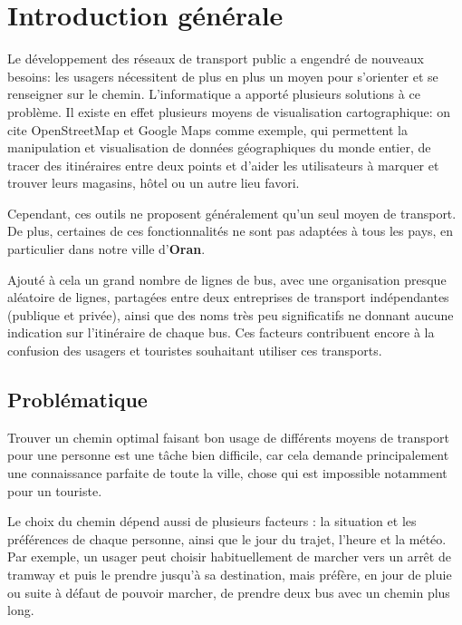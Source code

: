 \renewcommand\labelitemi{$\bullet$}
\renewcommand\labelitemii{$\circ$}
\chapter{Introduction générale}

Le développement des réseaux de transport public a engendré de nouveaux besoins: les usagers nécessitent de plus en plus un moyen pour s'orienter et se renseigner sur le chemin.\newline
L'informatique a apporté plusieurs solutions à ce problème. Il existe en effet plusieurs moyens de visualisation cartographique: on cite OpenStreetMap et Google Maps comme exemple, qui permettent la manipulation et visualisation de données géographiques du monde entier, de tracer des itinéraires entre deux points et d'aider les utilisateurs à marquer et trouver leurs magasins, hôtel ou un autre lieu favori.


Cependant, ces outils ne proposent généralement qu'un seul moyen de transport. De plus, certaines de ces fonctionnalités ne sont pas adaptées à tous les pays, en particulier dans notre ville d'\textbf{Oran}. 

Ajouté à cela un grand nombre de lignes de bus, avec une organisation presque aléatoire de lignes, partagées entre deux entreprises de transport indépendantes (publique et privée), ainsi que des noms très peu significatifs ne donnant aucune indication sur l'itinéraire de chaque bus.\newline
Ces facteurs contribuent encore à la confusion des usagers et touristes souhaitant utiliser ces transports.

\section{Problématique}
Trouver un chemin optimal faisant bon usage de différents moyens de transport pour une personne est une tâche bien difficile, car cela demande principalement une connaissance parfaite de toute la ville, chose qui est impossible notamment pour un touriste.\newline

Le choix du chemin dépend aussi de plusieurs facteurs : la situation et les préférences de chaque personne, ainsi que le jour du trajet, l'heure et la météo. Par exemple, un usager peut choisir habituellement de marcher vers un arrêt de tramway et
puis le prendre jusqu'à sa destination, mais préfère, en jour de pluie ou suite à défaut de pouvoir marcher, de prendre deux bus avec un chemin plus long.

